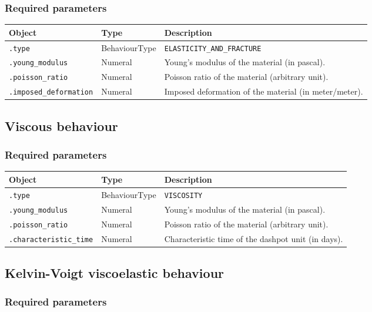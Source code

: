 \documentclass[10pt]{article}
\begin{document}
\subsubsection*{Required parameters}

\begin{tabularx}{\textwidth}{llX}
\hline 
Object & Type & Description \\ 
\hline 
\verb+.type+ & BehaviourType & \verb+ELASTICITY_AND_FRACTURE+ \\ 
\verb+.young_modulus+ & Numeral & Young's modulus of the material (in pascal). \\ 
\verb+.poisson_ratio+ & Numeral & Poisson ratio of the material (arbitrary unit). \\ 
\verb+.imposed_deformation+ & Numeral & Imposed deformation of the material (in meter/meter). \\ 
\hline 
\end{tabularx}

\subsection{Viscous behaviour}

\subsubsection*{Required parameters}

\begin{tabularx}{\textwidth}{llX}
\hline 
Object & Type & Description \\ 
\hline 
\verb+.type+ & BehaviourType & \verb+VISCOSITY+ \\ 
\verb+.young_modulus+ & Numeral & Young's modulus of the material (in pascal). \\ 
\verb+.poisson_ratio+ & Numeral & Poisson ratio of the material (arbitrary unit). \\ 
\verb+.characteristic_time+ & Numeral & Characteristic time of the dashpot unit (in days). \\ 
\hline 
\end{tabularx}

\subsection{Kelvin-Voigt viscoelastic behaviour}

\subsubsection*{Required parameters}
\end{document}
